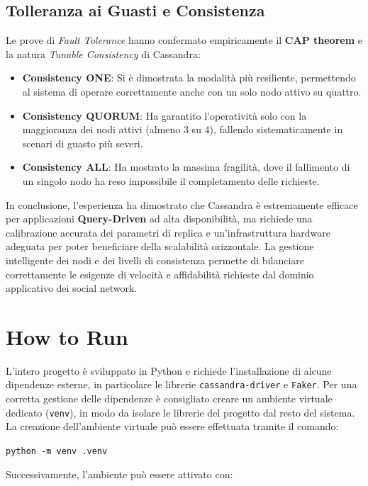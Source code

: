 \documentclass[12pt]{article}
\begin{document}
\subsection{Tolleranza ai Guasti e Consistenza}
Le prove di \textit{Fault Tolerance} hanno confermato empiricamente il \textbf{CAP theorem} e la natura \textit{Tunable Consistency} di Cassandra:
\begin{itemize}
    \item \textbf{Consistency ONE}: Si è dimostrata la modalità più resiliente, permettendo al sistema di operare correttamente anche con un solo nodo attivo su quattro.
    \item \textbf{Consistency QUORUM}: Ha garantito l'operatività solo con la maggioranza dei nodi attivi (almeno 3 su 4), fallendo sistematicamente in scenari di guasto più severi.
    \item \textbf{Consistency ALL}: Ha mostrato la massima fragilità, dove il fallimento di un singolo nodo ha reso impossibile il completamento delle richieste.
\end{itemize}

\noindent
In conclusione, l'esperienza ha dimostrato che Cassandra è estremamente efficace per applicazioni \textbf{Query-Driven} ad alta disponibilità, ma richiede una calibrazione accurata dei parametri di replica e un'infrastruttura hardware adeguata per poter beneficiare della scalabilità orizzontale. La gestione intelligente dei nodi e dei livelli di consistenza permette di bilanciare correttamente le esigenze di velocità e affidabilità richieste dal dominio applicativo dei social network.

\section{How to Run}
L'intero progetto è sviluppato in Python e richiede l'installazione di alcune dipendenze esterne, in particolare le librerie \texttt{cassandra-driver} e \texttt{Faker}. Per una corretta gestione delle dipendenze è consigliato creare un ambiente virtuale dedicato (\texttt{venv}), in modo da isolare le librerie del progetto dal resto del sistema.\newline\newline
\noindent
La creazione dell'ambiente virtuale può essere effettuata tramite il comando:

\texttt{python -m venv .venv}

\vspace{0.5cm}
\noindent
Successivamente, l'ambiente può essere attivato con:
\end{document}
